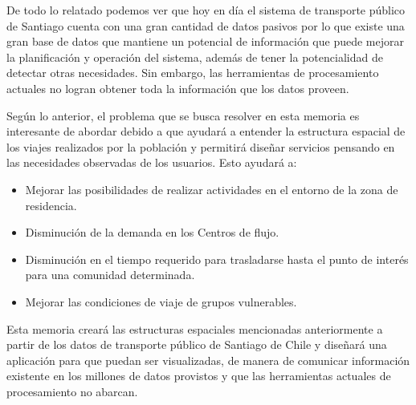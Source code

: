 \documentclass[12pt]{article}
\begin{document}
    De todo lo relatado podemos ver que hoy en día el sistema de transporte público de Santiago cuenta con una gran cantidad de datos pasivos por lo que existe una gran base de datos que mantiene un potencial de información que puede mejorar la planificación y operación del sistema, además de tener la potencialidad de detectar otras necesidades. Sin embargo, las herramientas de procesamiento actuales no logran obtener toda la información que los datos proveen.

    Según lo anterior, el problema que se busca resolver en esta memoria es interesante de abordar debido a que ayudará a entender la estructura espacial de los viajes realizados por la población y permitirá diseñar servicios pensando en las necesidades observadas de los usuarios. Esto ayudará a:

    \begin{itemize}
    \item Mejorar las posibilidades de realizar actividades en el entorno de la zona de residencia.
    \item Disminución de la demanda en los Centros de flujo.
    \item Disminución en el tiempo requerido para trasladarse hasta el punto de interés para una comunidad determinada.
    \item Mejorar las condiciones de viaje de grupos vulnerables.
    \end{itemize}

Esta memoria creará las estructuras espaciales mencionadas anteriormente a partir de los datos de transporte público de Santiago de Chile y diseñará una aplicación para que puedan ser visualizadas, de manera de comunicar información existente en los millones de datos provistos y que las herramientas actuales de procesamiento no abarcan.


\end{document}
